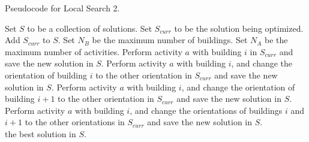 \begin{algorithm}
	\caption{Pseudocode for Local Search 2.}
	\label{pseudocode-local-search-2}
	\begin{algorithmic}[1]
		\State Set $S$ to be a collection of solutions.
		\State Set $S_{curr}$ to be the solution being optimized.
		\State Add $S_{curr}$ to $S$.
		\State Set $N_{B}$ be the maximum number of buildings.
		\State Set $N_{A}$ be the maximum number of activities.
		\State Perform activity $a$ with building $i$ in $S_{curr}$ and save the new solution in $S$.
		\State Perform activity $a$ with building $i$, and change the orientation of \WRP building $i$ to the other orientation in $S_{curr}$ and save the new \WRP solution in $S$.
		\State Perform activity $a$ with building $i$, and change the orientation of \WRP building $i + 1$ to the other orientation in $S_{curr}$ and save the new \WRP solution in $S$.
		\State Perform activity $a$ with building $i$, and change the orientations of \WRP buildings $i$ and $i + 1$ to the other orientations in $S_{curr}$ and save the new \WRP solution in $S$.
		\EndFor
		\EndFor \\
		\Return the best solution in $S$.
	\end{algorithmic}
\end{algorithm}